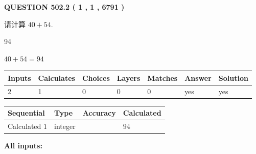 \documentclass{ctexart}
\begin{document}
   
  
\vspace{0.2in}
  
{\textbf{\Large{QUESTION
502.2 
 ( 1 , 1 , 6791 )
}}}
  
  
 
请计算 $ %
40 +  %
54 $.
 
 
 
\noindent{}
 
 

94
 
 
\noindent{}
 
 

 
 
 
\noindent{}
 
 

$ %
40 +  %
54=   %
94$
 
 
\noindent{}
 
 

 
   
   
   
   
\noindent\begin{tabular}{|l|l|l|l|l|l|l|}
 \hline
Inputs & Calculates & Choices & Layers & Matches & Answer & Solution \\ \hline
 2  & 
 1  & 
 0
  & 
 0  & 
 0  & 
  yes & 
  yes 
  \\ \hline
 \end{tabular}
   
   
   
   
\noindent{}
   
   
  
  
\noindent\begin{tabular}{|l|l|l|l|}
\hline
 Sequential & Type & Accuracy & Calculated \\ 
\hline
 
 
  Calculated $  1 $ & integer &  & 
  $ 94 $ 
 \\  \hline  
 \end{tabular}
   
   
   
   
\noindent\vspace{0.1in}\hspace{-0.08in} {\textbf{\Large{All inputs: }}}
   
\end{document}
